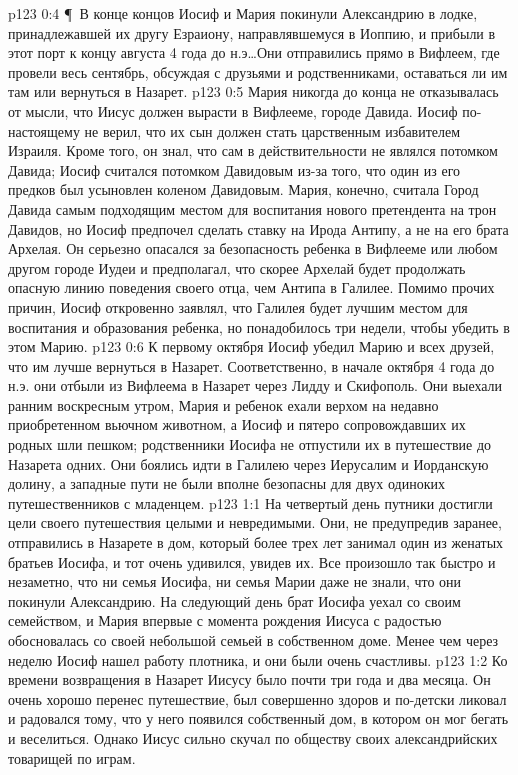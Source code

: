 \vs p123 0:4 \P\ В конце концов Иосиф и Мария покинули Александрию в лодке, принадлежавшей их другу Езраиону, направлявшемуся в Иоппию, и прибыли в этот порт к концу августа 4 года до н.э\ldots Они отправились прямо в Вифлеем, где провели весь сентябрь, обсуждая с друзьями и родственниками, оставаться ли им там или вернуться в Назарет.
\vs p123 0:5 Мария никогда до конца не отказывалась от мысли, что Иисус должен вырасти в Вифлееме, городе Давида. Иосиф по\hyp{}настоящему не верил, что их сын должен стать царственным избавителем Израиля. Кроме того, он знал, что сам в действительности не являлся потомком Давида; Иосиф считался потомком Давидовым из\hyp{}за того, что один из его предков был усыновлен коленом Давидовым. Мария, конечно, считала Город Давида самым подходящим местом для воспитания нового претендента на трон Давидов, но Иосиф предпочел сделать ставку на Ирода Антипу, а не на его брата Архелая. Он серьезно опасался за безопасность ребенка в Вифлееме или любом другом городе Иудеи и предполагал, что скорее Архелай будет продолжать опасную линию поведения своего отца, чем Антипа в Галилее. Помимо прочих причин, Иосиф откровенно заявлял, что Галилея будет лучшим местом для воспитания и образования ребенка, но понадобилось три недели, чтобы убедить в этом Марию.
\vs p123 0:6 К первому октября Иосиф убедил Марию и всех друзей, что им лучше вернуться в Назарет. Соответственно, в начале октября 4 года до н.э. они отбыли из Вифлеема в Назарет через Лидду и Скифополь. Они выехали ранним воскресным утром, Мария и ребенок ехали верхом на недавно приобретенном вьючном животном, а Иосиф и пятеро сопровождавших их родных шли пешком; родственники Иосифа не отпустили их в путешествие до Назарета одних. Они боялись идти в Галилею через Иерусалим и Иорданскую долину, а западные пути не были вполне безопасны для двух одиноких путешественников с младенцем.
\vs p123 1:1 На четвертый день путники достигли цели своего путешествия целыми и невредимыми. Они, не предупредив заранее, отправились в Назарете в дом, который более трех лет занимал один из женатых братьев Иосифа, и тот очень удивился, увидев их. Все произошло так быстро и незаметно, что ни семья Иосифа, ни семья Марии даже не знали, что они покинули Александрию. На следующий день брат Иосифа уехал со своим семейством, и Мария впервые с момента рождения Иисуса с радостью обосновалась со своей небольшой семьей в собственном доме. Менее чем через неделю Иосиф нашел работу плотника, и они были очень счастливы.
\vs p123 1:2 Ко времени возвращения в Назарет Иисусу было почти три года и два месяца. Он очень хорошо перенес путешествие, был совершенно здоров и по\hyp{}детски ликовал и радовался тому, что у него появился собственный дом, в котором он мог бегать и веселиться. Однако Иисус сильно скучал по обществу своих александрийских товарищей по играм.
